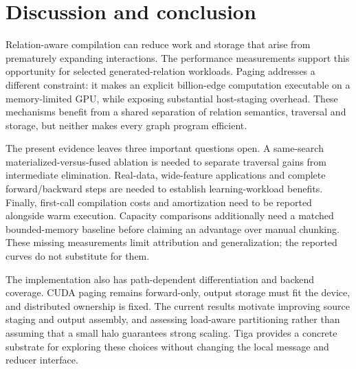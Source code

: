 \section{Discussion and conclusion}
Relation-aware compilation can reduce work and storage that arise from
prematurely expanding interactions. The performance measurements support this
opportunity for selected generated-relation workloads. Paging addresses a
different constraint: it makes an explicit billion-edge computation executable
on a memory-limited GPU, while exposing substantial host-staging overhead.
These mechanisms benefit from a shared separation of relation semantics,
traversal and storage, but neither makes every graph program efficient.

The present evidence leaves three important questions open. A same-search
materialized-versus-fused ablation is needed to separate traversal gains from
intermediate elimination. Real-data, wide-feature applications and complete
forward/backward steps are needed to establish learning-workload benefits.
Finally, first-call compilation costs and amortization need to be reported
alongside warm execution. Capacity comparisons additionally need a matched
bounded-memory baseline before claiming an advantage over manual chunking.
These missing measurements limit attribution and generalization; the reported
curves do not substitute for them.

The implementation also has path-dependent differentiation and backend coverage.
CUDA paging remains forward-only, output storage must fit the device, and
distributed ownership is fixed. The current results motivate improving source
staging and output assembly, and assessing load-aware partitioning rather than
assuming that a small halo guarantees strong scaling. Tiga provides a concrete
substrate for exploring these choices without changing the local message and
reducer interface.
